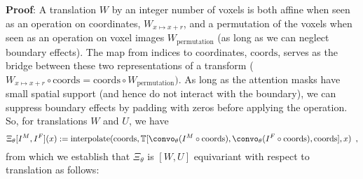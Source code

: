 \textbf{Proof}: A translation $W$ by an integer number of voxels is both affine when seen as an operation on coordinates, $W_{x \mapsto x + r}$, and a permutation of the
voxels when seen as an operation on voxel images $W_{\text{permutation}}$ (as long as we can neglect boundary effects). The map from indices to coordinates, $\text{coords}$, serves as the bridge between these two representations of a transform ($W_{x \mapsto x + r} \circ \text{coords} = \text{coords} \circ W_{\text{permutation}})$. As long as the attention masks have small spatial support (and hence do not interact with the boundary), we can suppress boundary effects by padding with zeros before applying the operation. So, for translations $W$ and $U$, we have
\[\Xi_\theta[ I^M, I^F](x) :=\text{interpolate}(\text{coords}, \mathbb{T}[\convo_\theta (I^M \circ \text{coords}) , \convo_\theta(I^F \circ \text{coords}), \text{coords}], x)\enspace, \]
from which we establish that $\Xi_\theta$ is $[W, U]$ equivariant with respect to translation as follows: 

